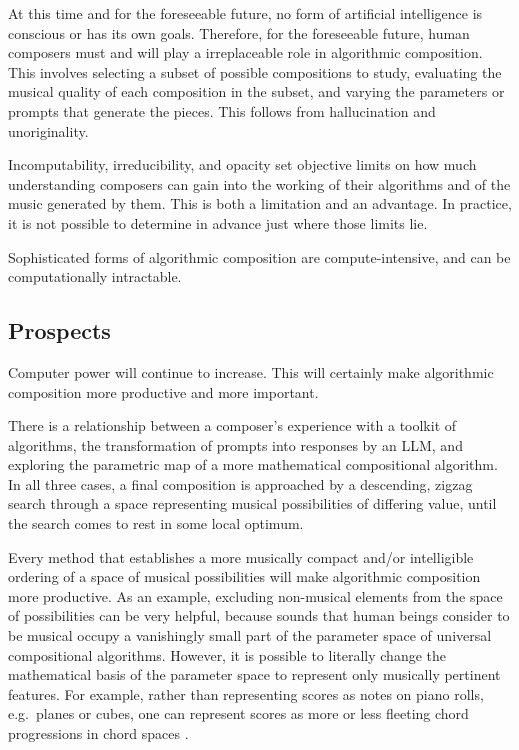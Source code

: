 \documentclass[11pt]{scrartcl}
\begin{document}
At this time and for the foreseeable future, no form of artificial intelligence is conscious or has its own goals. Therefore, for the foreseeable future, human composers must and will play a irreplaceable role in algorithmic composition. This involves selecting a subset of possible compositions to study, evaluating the musical quality of each composition in the subset, and varying the parameters or prompts that generate the pieces. This follows from hallucination and unoriginality.

Incomputability, irreducibility, and opacity set objective limits on how much understanding composers can gain into the working of their algorithms and of the music generated by them. This is both a limitation and an advantage. In practice, it is not possible to determine in advance just where those limits lie.

Sophisticated forms of algorithmic composition are compute-intensive, and can be computationally intractable.

\subsection*{Prospects}

Computer power will continue to increase. This will certainly make algorithmic composition more productive and more important.

There is a relationship between a composer's experience with a toolkit of algorithms, the transformation of prompts into responses by an LLM, and exploring the parametric map of a more mathematical compositional algorithm. In all three cases, a final composition is approached by a descending, zigzag search through a space representing musical possibilities of differing value, until the search comes to rest in some local optimum.

Every method that establishes a more musically compact and/or intelligible ordering of a space of musical possibilities will make algorithmic composition more productive. As an example, excluding non-musical elements from the space of possibilities can be very helpful, because sounds that human beings consider to be musical occupy a vanishingly small part of the parameter space of universal compositional algorithms. However, it is possible to literally change the mathematical basis of the parameter space to represent only musically pertinent features. For example, rather than representing scores as notes on piano rolls, e.g.\ planes or cubes, one can represent scores as more or less fleeting chord progressions in chord spaces \parencite{gogins2006score, gogins2023scoregraphs}.
\end{document}
